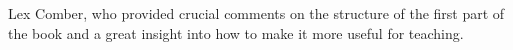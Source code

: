 % 
% 
\item Lex Comber, who provided crucial comments on the structure of the first part of the book and a great insight into how to make it more useful for teaching.
% 


